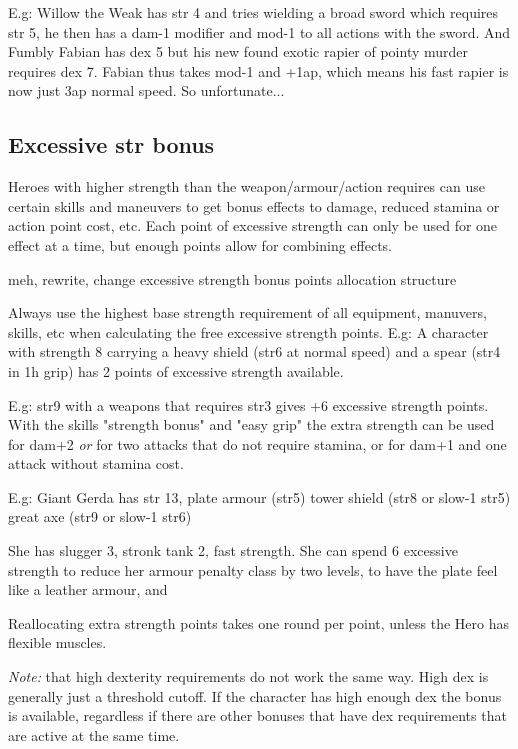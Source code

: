 E.g: Willow the Weak has str 4 and tries wielding a broad sword which requires str 5, he then has a dam-1 modifier and mod-1 to all actions with the sword.
And Fumbly Fabian has dex 5 but his new found exotic rapier of pointy murder requires dex 7. Fabian thus takes mod-1 and +1ap, which means his fast rapier is now just 3ap normal speed. So unfortunate...


\subsection*{Excessive str bonus}
Heroes with higher strength than the weapon/armour/action requires can use certain skills and maneuvers to get bonus effects to damage, reduced stamina or action point cost, etc. Each point of excessive strength can only be used for one effect at a time, but enough points allow for combining effects.

\TODO meh, rewrite, change excessive strength bonus points allocation structure

Always use the highest base strength requirement of all equipment, manuvers, skills, etc when calculating the free excessive strength points.
E.g: A character with strength 8 carrying a heavy shield (str6 at normal speed) and a spear (str4 in 1h grip) has 2 points of excessive strength available.

E.g: str9 with a weapons that requires str3 gives +6 excessive strength points. With the skills "strength bonus" and "easy grip" the extra strength can be used for dam+2 \emph{or} for two attacks that do not require stamina, or for dam+1 and one attack without stamina cost.

E.g: Giant Gerda has str 13, 
plate armour (str5)
tower shield (str8 or slow-1 str5)
great axe (str9 or slow-1 str6)


She has slugger 3, stronk tank 2, fast strength.
She can spend 6 excessive strength to reduce her armour penalty class by two levels, to have the plate feel like a leather armour, and 

Reallocating extra strength points takes one round per point, unless the Hero has flexible muscles.

\emph{Note:} that high dexterity requirements do not work the same way. High dex is generally just a threshold cutoff. If the character has high enough dex the bonus is available, regardless if there are other bonuses that have dex requirements that are active at the same time.


